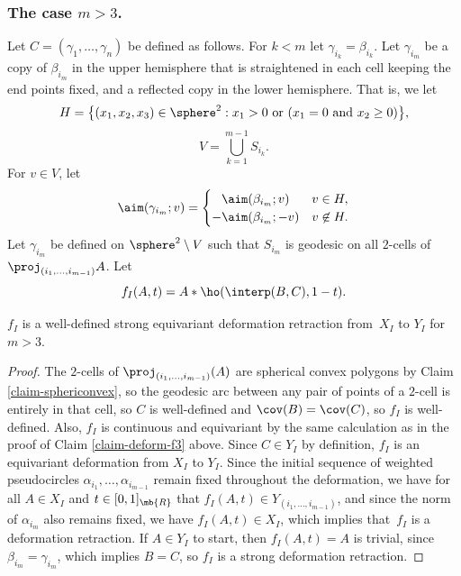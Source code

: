 \subsubsection*{The case $m>3$.}
Let $C\!=\!(\gamma_1,\dots,\gamma_n)$ be defined as follows.
For $k\!<\!m$ let $\gamma_{i_k}\!=\!\beta_{i_k}$.
Let $\gamma_{i_m}$ be a copy of $\beta_{i_m}$ in the upper hemisphere that is straightened in each cell keeping the end points fixed, and a reflected copy in the lower hemisphere.
That is, we let
\[ H = \bigl\{(x_1,x_2,x_3) \in \sphere^2 :x_1 > 0 \text{ or } (x_1=0 \text{ and } x_2 \geq 0)\bigr\}, \]
\[ V = \bigcup_{k=1}^{m-1} S_{i_k}. \]
For $v \in V$, let
\[ \aim (\gamma_{i_m}; v) = \begin{cases}
\phantom{-}\aim (\beta_{i_m}; v) & v \in H, \\
{-}\aim (\beta_{i_m}; -v) & v \not\in H.
\end{cases}\]
Let $\gamma_{i_m}$ be defined on $\sphere^2 \setminus V$ such that $S_{i_m}$ is geodesic on all $2$-cells of $\proj_{(i_1,\dots,i_{m-1})} A$.
Let
\[ f_{I}(A,t) = A*\ho(\interp(B,C),1-t).\]

\begin{claim}\label{claim-deform-f}
$f_I$ is a well-defined strong equivariant deformation retraction from~$X_I$ to $Y_I$ for $m>3$.
\end{claim}

\begin{proof}
The $2$-cells of $\proj_{(i_1,\dots,i_{m-1})}(A)$ are spherical convex polygons by Claim \ref{claim-sphericonvex}, so the geodesic arc between any pair of points of a $2$-cell is entire\-ly in that cell, so $C$ is well-defined and $\cov(B)=\cov(C)$, so $f_I$ is well-defined.
Also, $f_I$ is continuous and equivariant by the same calculation as in the proof of Claim \ref{claim-deform-f3} above.
Since $C \in Y_I$ by definition, $f_I$ is an equivariant deformation from $X_I$ to $Y_I$.
Since the initial sequence of weighted pseudocircles $\alpha_{i_1},\dots,\alpha_{i_{m-1}}$ remain fixed throughout the deformation, we have for all $A \in X_I$ and $t \in [0,1]_\mb{R}$ that $f_I(A,t) \in Y_{(i_1,\dots,i_{m-1})}$, and since the norm of $\alpha_{i_m}$ also remains fixed, we have $f_I(A,t) \in X_I$, which implies that~$f_I$ is a deformation retraction.
If $A \in Y_I$ to start, then $f_I(A,t) = A$ is trivial, since $\beta_{i_m} = \gamma_{i_m}$, which implies $B=C$, so $f_I$ is a strong deformation retraction.
\end{proof}

